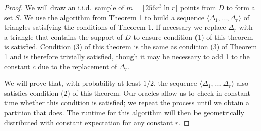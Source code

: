 \documentclass{patmorin}
\begin{document}
\def\isdef{\buildrel {\rm def} \over =}
\def\PROB{\Pr}

\begin{proof}
We will draw an i.i.d.\ sample of $m = \lceil 256r^3\ln r \rceil$
points from $D$ to form a set $S$.  We use the algorithm from Theorem
1 to build a sequence $\langle \Delta_1, \ldots, \Delta_r \rangle$
of triangles satisfying the conditions of Theorem 1.  If necessary we
replace $\Delta_r$ with a triangle that contains the support of $D$
to ensure condition (1) of this theorem is satisfied.  Condition (3) of
this theorem is the same as condition (3) of Theorem 1 and is therefore
trivially satisfied, though it may be necessary to add 1 to the constant
$c$ due to the replacement of $\Delta_r$.

We will prove that, with probability at least $1/2$, the sequence
$\langle \Delta_1, \ldots, \Delta_r \rangle$ also satisfies condition
(2) of this theorem.  Our oracles allow us to check in constant time
whether this condition is satisfied; we repeat the process until we
obtain a partition that does.  The runtime for this algorithm will then be
geometrically distributed with constant expectation for any constant $r$.


\end{proof}
\end{document}
